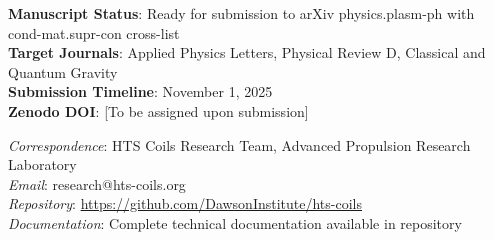 \documentclass[12pt,a4paper]{article}
\begin{document}
\textbf{Manuscript Status}: Ready for submission to arXiv physics.plasm-ph with cond-mat.supr-con cross-list\\
\textbf{Target Journals}: Applied Physics Letters, Physical Review D, Classical and Quantum Gravity\\
\textbf{Submission Timeline}: November 1, 2025\\
\textbf{Zenodo DOI}: [To be assigned upon submission]

\textit{Correspondence}: HTS Coils Research Team, Advanced Propulsion Research Laboratory\\
\textit{Email}: research@hts-coils.org\\
\textit{Repository}: \url{https://github.com/DawsonInstitute/hts-coils}\\
\textit{Documentation}: Complete technical documentation available in repository
\end{document}
